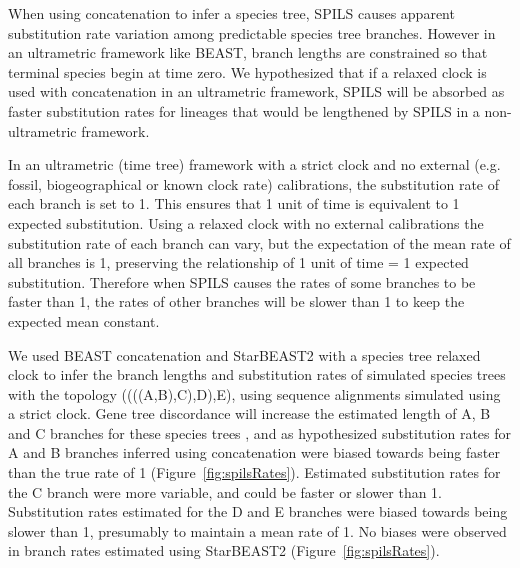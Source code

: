 \documentclass[12pt]{article}
\begin{document}
When using concatenation to infer a species tree, SPILS causes apparent
substitution rate variation among predictable species tree branches. However in
an ultrametric framework like BEAST, branch lengths are constrained so that
terminal species begin at time zero. We hypothesized that if a relaxed clock is
used with concatenation in an ultrametric framework, SPILS will be absorbed as
faster substitution rates for lineages that would be lengthened by SPILS in a
non-ultrametric framework.

In an ultrametric (time tree) framework with a strict clock and no external (e.g. fossil,
biogeographical or known clock rate)
calibrations, the substitution rate of each branch is set to 1. This ensures that 1 unit of time
is equivalent to 1 expected substitution. Using a relaxed clock with no external calibrations
the substitution rate of each branch can vary, but the expectation of the mean rate of all
branches is 1, preserving the relationship of 1 unit of time = 1 expected substitution.
Therefore when SPILS causes the rates of some branches to be faster than 1,
the rates of other branches will be slower than 1 to keep the expected mean constant.

We used BEAST concatenation and StarBEAST2 with a species tree relaxed clock to
infer the branch lengths and substitution rates of simulated species trees with
the topology ((((A,B),C),D),E), using sequence alignments simulated using a strict
clock. Gene tree discordance will increase the estimated length of A, B and C
branches for these species trees \citep{Mendes01072016}, and as hypothesized
substitution rates for A and B branches inferred using concatenation were biased
towards being faster than the true rate of 1 (Figure~\ref{fig:spilsRates}).
Estimated substitution rates for the C branch were more variable, and could be
faster or slower than 1. Substitution rates estimated for the D and E branches
were biased towards being slower than 1, presumably to maintain a mean rate of
1. No biases were observed in branch rates estimated using StarBEAST2
(Figure~\ref{fig:spilsRates}).
\end{document}
